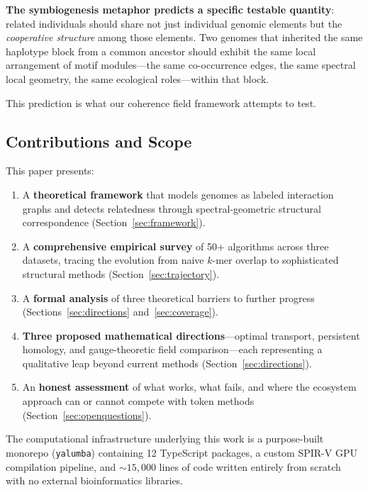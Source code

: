 \documentclass{../yalumba}
\begin{document}
\begin{keyfinding}
\textbf{The symbiogenesis metaphor predicts a specific testable
quantity}: related individuals should share not just individual genomic
elements but the \emph{cooperative structure} among those elements.
Two genomes that inherited the same haplotype block from a common
ancestor should exhibit the same local arrangement of motif modules---the
same co-occurrence edges, the same spectral local geometry, the same
ecological roles---within that block.
\end{keyfinding}

This prediction is what our coherence field framework attempts to test.

\subsection{Contributions and Scope}
\label{sec:intro:contributions}

This paper presents:

\begin{enumerate}
  \item A \textbf{theoretical framework} that models genomes as labeled
    interaction graphs and detects relatedness through spectral-geometric
    structural correspondence (Section~\ref{sec:framework}).
  \item A \textbf{comprehensive empirical survey} of 50+ algorithms
    across three datasets, tracing the evolution from naive $k$-mer
    overlap to sophisticated structural methods
    (Section~\ref{sec:trajectory}).
  \item A \textbf{formal analysis} of three theoretical barriers to
    further progress (Sections~\ref{sec:directions}
    and~\ref{sec:coverage}).
  \item \textbf{Three proposed mathematical directions}---optimal
    transport, persistent homology, and gauge-theoretic field
    comparison---each representing a qualitative leap beyond current
    methods (Section~\ref{sec:directions}).
  \item An \textbf{honest assessment} of what works, what fails, and
    where the ecosystem approach can or cannot compete with
    token methods (Section~\ref{sec:openquestions}).
\end{enumerate}

The computational infrastructure underlying this work is a
purpose-built monorepo (\texttt{yalumba}) containing 12 TypeScript
packages, a custom SPIR-V GPU compilation pipeline, and
${\sim}15{,}000$ lines of code written entirely from scratch with no
external bioinformatics libraries.
\end{document}
